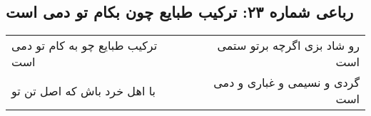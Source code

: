 \begin{center}
\section*{رباعی شماره ۲۳: ترکیب طبایع چون بکام تو دمی است}
\label{sec:sh023}
\begin{longtable}{l p{0.5cm} r}
ترکیب طبایع چو به کام تو دمی است
&&
رو شاد بزی اگرچه برتو ستمی است
\\
با اهل خرد باش که اصل تن تو
&&
گردی و نسیمی و غباری و دمی است
\\
\end{longtable}
\end{center}
